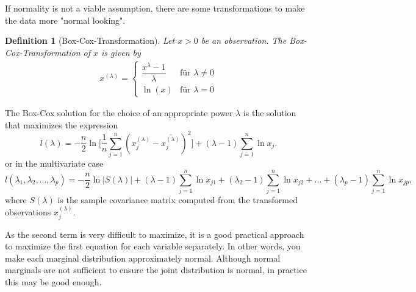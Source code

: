 \documentclass[a4paper]{article}
\newtheorem*{defi}{Definition}
\begin{document}
If normality is not a viable assumption, there are some transformations to make the data more "normal looking". 

\begin{defi}[Box-Cox-Transformation]
Let $x>0$ be an observation. The Box-Cox-Transformation of $x$ is given by \begin{align*}
x^{(\lambda)}=\left\{\begin{matrix} \dfrac{x^\lambda-1} {\lambda} & \text{für }\lambda \ne 0 \\[10pt] \ln(x) & \text{für }\lambda = 0\end{matrix}\right.
\end{align*}
\end{defi}
\vspace{0.5cm}
The Box-Cox solution for the choice of an appropriate power $\lambda$ is the solution that maximizes the expression $$l(\lambda)=-\frac{n}{2}\ln\biggl[\frac{1}{n}\sum_{j=1}^n(x_j^{(\lambda)}-\overline{x_j^{(\lambda)}})^2\biggr]+(\lambda-1)\sum_{j=1}^n\ln x_j.$$ or in the multivariate case $$l(\lambda_1, \lambda_2, ..., \lambda_p) = -\frac{n}{2}\ln|S(\lambda)|+(\lambda-1)\sum_{j=1}^{n}\ln x_{j1}+(\lambda_2-1)\sum_{j=1}^{n}\ln x_{j2} + ... + (\lambda_p-1)\sum_{j=1}^{n}\ln x_{jp},$$ where $S(\lambda)$ is the sample covariance matrix computed from the transformed observations $x_j^{(\lambda)}$.

As the second term is very difficult to maximize, it is a good practical approach to maximize the first equation for each variable separately. In other words, you make each marginal distribution approximately normal. Although normal marginals are not sufficient to ensure the joint distribution is normal, in practice this may be good enough. 
\end{document}
